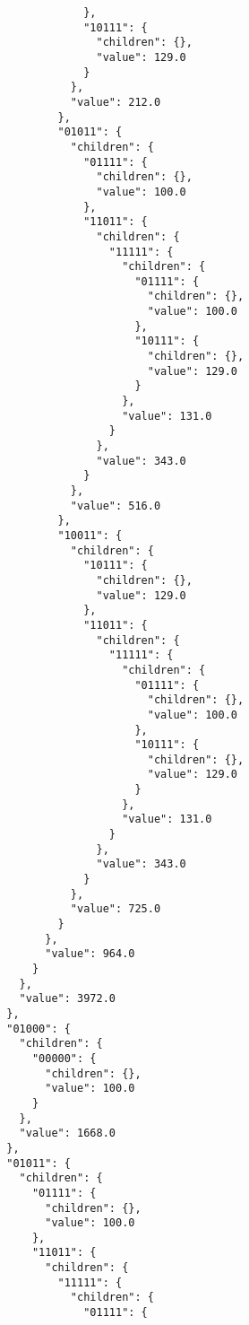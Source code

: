 \documentclass{article}
\begin{document}
\begin{listing}
\begin{verbatim}
                    },
                    "10111": {
                      "children": {},
                      "value": 129.0
                    }
                  },
                  "value": 212.0
                },
                "01011": {
                  "children": {
                    "01111": {
                      "children": {},
                      "value": 100.0
                    },
                    "11011": {
                      "children": {
                        "11111": {
                          "children": {
                            "01111": {
                              "children": {},
                              "value": 100.0
                            },
                            "10111": {
                              "children": {},
                              "value": 129.0
                            }
                          },
                          "value": 131.0
                        }
                      },
                      "value": 343.0
                    }
                  },
                  "value": 516.0
                },
                "10011": {
                  "children": {
                    "10111": {
                      "children": {},
                      "value": 129.0
                    },
                    "11011": {
                      "children": {
                        "11111": {
                          "children": {
                            "01111": {
                              "children": {},
                              "value": 100.0
                            },
                            "10111": {
                              "children": {},
                              "value": 129.0
                            }
                          },
                          "value": 131.0
                        }
                      },
                      "value": 343.0
                    }
                  },
                  "value": 725.0
                }
              },
              "value": 964.0
            }
          },
          "value": 3972.0
        },
        "01000": {
          "children": {
            "00000": {
              "children": {},
              "value": 100.0
            }
          },
          "value": 1668.0
        },
        "01011": {
          "children": {
            "01111": {
              "children": {},
              "value": 100.0
            },
            "11011": {
              "children": {
                "11111": {
                  "children": {
                    "01111": {

\end{verbatim}
\end{listing}
\end{document}
